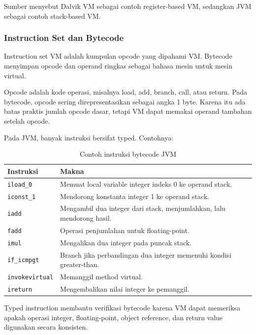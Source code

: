 Sumber menyebut Dalvik VM sebagai contoh register-based VM, sedangkan JVM sebagai contoh stack-based VM.

\subsubsection{Instruction Set dan Bytecode}

\begin{jawab}
Instruction set VM adalah kumpulan opcode yang dipahami VM. Bytecode menyimpan opcode dan operand ringkas sebagai bahasa mesin untuk mesin virtual.
\end{jawab}

Opcode adalah kode operasi, misalnya load, add, branch, call, atau return. Pada bytecode, opcode sering direpresentasikan sebagai angka 1 byte. Karena itu ada batas praktis jumlah opcode dasar, tetapi VM dapat memakai operand tambahan setelah opcode.

Pada JVM, banyak instruksi bersifat typed. Contohnya:

\begin{table}[H]
\centering
\begin{tabularx}{\textwidth}{|L{0.20\textwidth}|X|}
\hline
\textbf{Instruksi} & \textbf{Makna} \\
\hline
\texttt{iload\_0} & Memuat local variable integer indeks 0 ke operand stack. \\
\hline
\texttt{iconst\_1} & Mendorong konstanta integer 1 ke operand stack. \\
\hline
\texttt{iadd} & Mengambil dua integer dari stack, menjumlahkan, lalu mendorong hasil. \\
\hline
\texttt{fadd} & Operasi penjumlahan untuk floating-point. \\
\hline
\texttt{imul} & Mengalikan dua integer pada puncak stack. \\
\hline
\texttt{if\_icmpgt} & Branch jika perbandingan dua integer memenuhi kondisi greater-than. \\
\hline
\texttt{invokevirtual} & Memanggil method virtual. \\
\hline
\texttt{ireturn} & Mengembalikan nilai integer ke pemanggil. \\
\hline
\end{tabularx}
\caption{Contoh instruksi bytecode JVM}
\label{tab:instruksi-bytecode-jvm}
\end{table}

Typed instruction membantu verifikasi bytecode karena VM dapat memeriksa apakah operasi integer, floating-point, object reference, dan return value digunakan secara konsisten.

